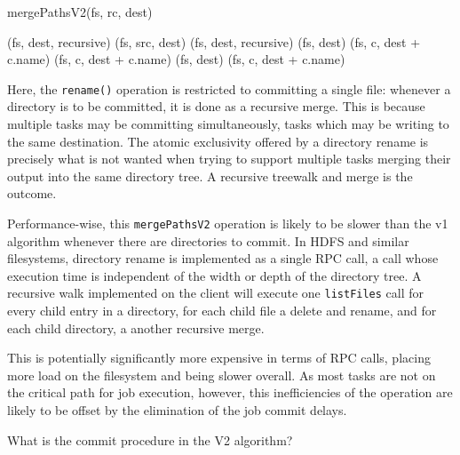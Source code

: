 \documentclass[conference]{IEEEtran}
\begin{document}
\begin{procedure*}
  \label{alg:mergePathsV2}
  \caption{mergePathsV2(fs, rc, dest)}


   {
     {
      \delete(fs, dest, recursive)\;
    }
    \rename(fs, src, dest)\;
    } {
       {
         {
          \delete(fs, dest, recursive)\;
          \mkdirs(fs, dest)\;
           {
            \mergePaths(fs, c, dest + c.name)\;
          }
      } {
         {
          \mergePaths(fs, c, dest + c.name)\;
        }
      }
    } {
      \mkdirs(fs, dest)\;
       {
         \mergePaths(fs, c, dest + c.name)\;
      }
    }
  }

\end{procedure*}

Here, the \texttt{rename()} operation is restricted to committing
a single file: whenever a directory is to be committed, it is done
as a recursive merge.
This is because multiple tasks may be committing simultaneously, tasks which
may be writing to the same destination.
The atomic exclusivity offered by a directory rename is precisely what is not
wanted when trying to support multiple tasks merging their output into the
same directory tree.
A recursive treewalk and merge is the outcome.


Performance-wise, this \texttt{mergePathsV2} operation is likely to be slower
than the v1 algorithm whenever there are directories to commit.
In HDFS and similar filesystems, directory rename is implemented as a single
RPC call, a call whose execution time is independent of the width or depth
of the directory tree.
A recursive walk implemented on the client will execute one \texttt{listFiles}
call for every child entry in a directory, for each child file a delete and
rename, and for each child directory, a another recursive merge.


This is potentially significantly more expensive in terms of RPC
calls, placing more load on the filesystem and being slower overall.
As most tasks are not on the critical path for job execution, however,
this inefficiencies of the operation are likely to be offset by the
elimination of the job commit delays.

What is the commit procedure in the V2 algorithm?
\end{document}
